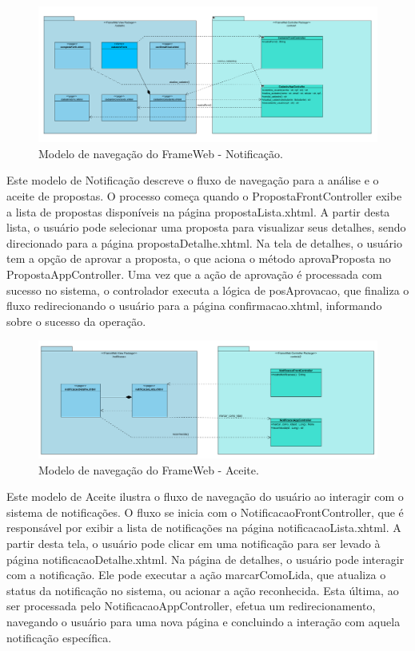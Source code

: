 \begin{figure}[H]
	\centering
	\includegraphics[width=1.0\textwidth]{figuras/figura_modelo_navegacao_notificacao.png}
	\caption{Modelo de navegação do FrameWeb - Notificação.}
	\label{figura-notificacao}
\end{figure}

Este modelo de Notificação descreve o fluxo de navegação para a análise e o aceite de propostas. O processo começa quando o PropostaFrontController exibe a lista de propostas disponíveis na página propostaLista.xhtml. A partir desta lista, o usuário pode selecionar uma proposta para visualizar seus detalhes, sendo direcionado para a página propostaDetalhe.xhtml. Na tela de detalhes, o usuário tem a opção de aprovar a proposta, o que aciona o método aprovaProposta no PropostaAppController. Uma vez que a ação de aprovação é processada com sucesso no sistema, o controlador executa a lógica de posAprovacao, que finaliza o fluxo redirecionando o usuário para a página confirmacao.xhtml, informando sobre o sucesso da operação.

\begin{figure}[H]
	\centering
	\includegraphics[width=1.0\textwidth]{figuras/figura_modelo_navegacao_aceite.png}
	\caption{Modelo de navegação do FrameWeb - Aceite.}
	\label{figura-aceite}
\end{figure}

Este modelo de Aceite ilustra o fluxo de navegação do usuário ao interagir com o sistema de notificações. O fluxo se inicia com o NotificacaoFrontController, que é responsável por exibir a lista de notificações na página notificacaoLista.xhtml. A partir desta tela, o usuário pode clicar em uma notificação para ser levado à página notificacaoDetalhe.xhtml. Na página de detalhes, o usuário pode interagir com a notificação. Ele pode executar a ação marcarComoLida, que atualiza o status da notificação no sistema, ou acionar a ação reconhecida. Esta última, ao ser processada pelo NotificacaoAppController, efetua um redirecionamento, navegando o usuário para uma nova página e concluindo a interação com aquela notificação específica.







